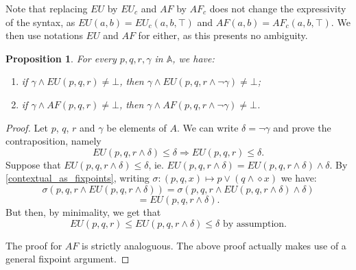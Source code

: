 \documentclass[11pt]{article}
\newcommand{\A}{{\mathbb A}}
\newtheorem{proposition}[definition]{Proposition}
\begin{document}
Note that replacing $EU$ by $EU_c$ and $AF$ by $AF_c$ does not change the expressivity of the syntax, as $EU(a,b)=EU_c(a,b,\top)$ and $AF(a,b)=AF_c(a,b,\top)$. We then use notations $EU$ and $AF$ for either, as this presents no ambiguity.
\begin{proposition}\label{context_rule_gamma}
    For every $p,q,r,\gamma$ in $\A$, we have:
    \begin{enumerate}
        \item if $\gamma \wedge EU(p,q,r) \neq \bot$, then $\gamma \wedge EU(p,q,r\wedge\neg\gamma)\neq\bot$;
        \item if $\gamma \wedge AF(p,q,r) \neq \bot$, then $\gamma \wedge AF(p,q,r\wedge\neg\gamma)\neq\bot$.
    \end{enumerate}
\end{proposition}
\begin{proof}
    Let $p$, $q$, $r$ and $\gamma$ be elements of $A$. We can write $\delta = \neg\gamma$ and prove the contraposition, namely\[EU(p,q,r\wedge \delta)\leq \delta\Rightarrow EU(p,q,r)\leq \delta.\] Suppose that $EU(p,q,r\wedge \delta)\leq \delta$, ie. $EU(p,q,r\wedge \delta)=EU(p,q,r\wedge \delta)\wedge\delta$. By \ref{contextual_as_fixpoints}, writing $\sigma: (p,q,x)\mapsto p\vee(q\wedge\diamond x) $ we have:\[\sigma(p,q,r\wedge EU(p,q,r\wedge \delta))=\sigma(p,q,r\wedge EU(p,q,r\wedge \delta)\wedge\delta)\]\[=EU(p,q,r\wedge \delta).\]But then, by minimality, we get that \[EU(p,q,r)\leq EU(p,q,r\wedge \delta)\leq\delta\mbox{ by assumption.}\]
    
    The proof for $AF$ is strictly analoguous. The above proof actually makes use of a general fixpoint argument.
\end{proof}
\end{document}
